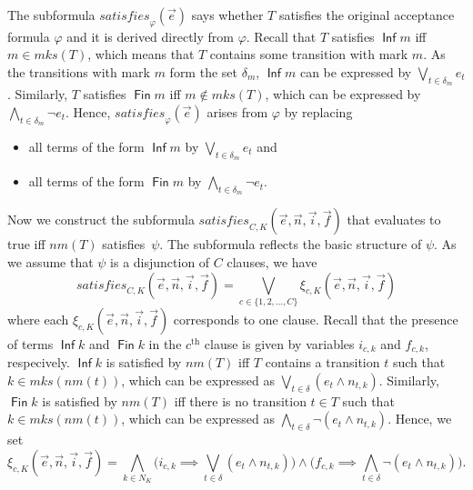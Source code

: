 \documentclass[a4paper,UKenglish,cleveref,autoref,thm-restate]{lipics-v2021}
\DeclareMathOperator{\Inf}{\mathsf{Inf}}
\DeclareMathOperator{\Fin}{\mathsf{Fin}}
\newcommand{\mks}{\mathit{mks}}
\newcommand{\rem}{\mathit{nm}}
\newcommand{\msat}{\mathit{satisfies}}
\begin{document}
The subformula $\msat_\varphi(\vec{e})$ says whether $T$ satisfies the
original acceptance formula $\varphi$ and it is derived directly from
$\varphi$. Recall that $T$ satisfies $\Inf m$ iff $m\in\mks(T)$, which
means that $T$ contains some transition with mark $m$. As the
transitions with mark $m$ form the set $\delta_m$, $\Inf m$ can be
expressed by $\bigvee_{t\in\delta_m}e_t$. Similarly, $T$ satisfies
$\Fin m$ iff $m\not\in\mks(T)$, which can be expressed by
$\bigwedge_{t\in\delta_m}\neg e_t$. Hence, $\msat_\varphi(\vec{e})$
arises from $\varphi$ by replacing
\begin{itemize}
\item all terms of the form $\Inf m$ by $\bigvee_{t\in\delta_m}e_t$ and
\item all terms of the form $\Fin m$ by $\bigwedge_{t\in\delta_m}\neg e_t$.
\end{itemize}

Now we construct the subformula
$\msat_{C,K}(\vec{e},\vec{n},\vec{i},\vec{f})$ that evaluates to true
iff $\rem(T)$ satisfies~$\psi$. The subformula reflects the basic
structure of $\psi$. As we assume that $\psi$ is a disjunction of $C$
clauses, we have
\[
  \msat_{C,K}(\vec{e},\vec{n},\vec{i},\vec{f})=\bigvee_{c\in\{1,2,\ldots,C\}}\xi_{c,K}(\vec{e},\vec{n},\vec{i},\vec{f})
\]
where each $\xi_{c,K}(\vec{e},\vec{n},\vec{i},\vec{f})$ corresponds to
one clause. Recall that the presence of terms $\Inf k$ and $\Fin k$ in
the $c^\textrm{th}$ clause is given by variables $i_{c,k}$ and
$f_{c,k}$, respecively. $\Inf k$ is satisfied by $\rem(T)$ iff $T$
contains a transition $t$ such that $k\in\mks(\rem(t))$, which can be
expressed as $\bigvee_{t\in\delta}(e_t\wedge n_{t,k})$. Similarly,
$\Fin k$ is satisfied by $\rem(T)$ iff there is no transition $t\in T$
such that $k\in\mks(\rem(t))$, which can be expressed as
$\bigwedge_{t\in\delta}\neg(e_t\wedge n_{t,k})$. Hence, we set
\[
  \xi_{c,K}(\vec{e},\vec{n},\vec{i},\vec{f})=
  \bigwedge_{k\in N_K}\Big(i_{c,k}\implies\bigvee_{t\in\delta}(e_t\wedge n_{t,k})\Big)\wedge\Big(f_{c,k}\implies\bigwedge_{t\in\delta}\neg(e_t\wedge n_{t,k})\Big).
\]
\end{document}
